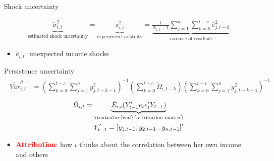 \documentclass{beamer}
\begin{document}
\begin{frame}{Shock uncertainty}
	
	
\begin{eqnarray}
\underbrace{\tilde{\sigma}^2_{i,t}}_{\text{estimated shock uncertainty}}=\underbrace{ s^2_{i,t}}_{\text{experienced volatility}} =\underbrace{\frac{1}{N_{i,t}-1} \sum^{n}_{j=1}\sum^{t-c}_{k=0} \hat e_{j,t-k}^2}_{\text{variance of residuals}}
\end{eqnarray}

	\begin{itemize}
	\item $\hat e_{i,t}$: unexpected income shocks 
\end{itemize} 
\end{frame}
\begin{frame}{Persistence uncertainty}
	\begin{eqnarray}
		\begin{split}
			\tilde {Var}^{\rho}_{i,t} & =   (\sum^{t-c}_{k=0}\sum^{n}_{j=1}y^2_{j,t-k-1})^{-1}(\sum^{t-c}_{k=0}\tilde \Omega_{i,t-k})(\sum^{t-c}_{k=0}\sum^{n}_{j=1}y^2_{j,t-k-1})^{-1}
		\end{split}
	\end{eqnarray}
	\begin{eqnarray}
		\begin{split}
			\tilde \Omega_{i,t} = \underbrace{\tilde E_{i,t}(Y'_{t-1}e_{t}e_{t}'Y_{t-1})}_{\textcolor{red}{\text{attribution matrix}}} \\
			Y'_{t-1} = [y_{1,t-1},y_{2,t-1}...y_{n,t-1}]'
		\end{split}
	\end{eqnarray}
	\begin{itemize}	  
		\item \textbf{\textcolor{red}{Attribution}}: how $i$ thinks about the correlation between her own income and others
	\end{itemize}
\end{frame}
\end{document}
